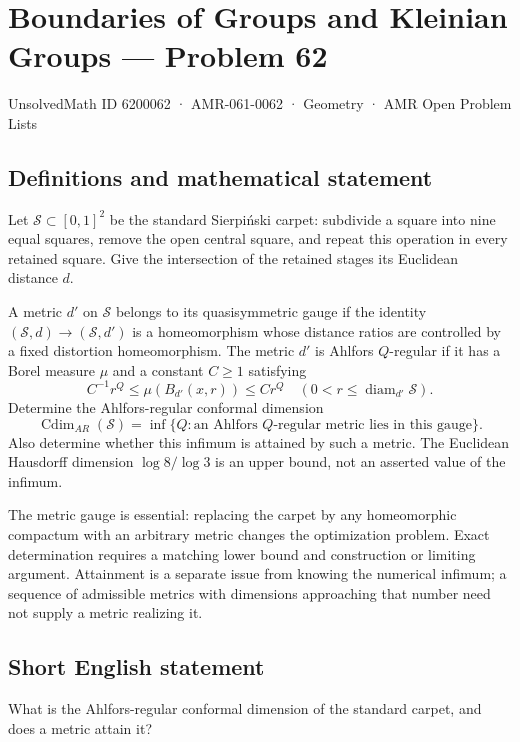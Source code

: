 \documentclass[11pt,a4paper]{article}
\begin{document}
\section*{Boundaries of Groups and Kleinian Groups — Problem 62}\label{6200062}
{\small UnsolvedMath ID 6200062 · AMR-061-0062 · Geometry · AMR Open Problem Lists}
\subsection{Definitions and mathematical statement}
Let $\mathcal S\subset[0,1]^2$ be the standard Sierpi\'nski carpet: subdivide a square into nine equal squares, remove the open central square, and repeat this operation in every retained square. Give the intersection of the retained stages its Euclidean distance $d$.

A metric $d'$ on $\mathcal S$ belongs to its quasisymmetric gauge if the identity $(\mathcal S,d)\to(\mathcal S,d')$ is a homeomorphism whose distance ratios are controlled by a fixed distortion homeomorphism. The metric $d'$ is Ahlfors $Q$-regular if it has a Borel measure $\mu$ and a constant $C\geq1$ satisfying
\[
 C^{-1}r^Q\leq\mu(B_{d'}(x,r))\leq Cr^Q
 \quad(0<r\leq\operatorname{diam}_{d'}\mathcal S).
\]
Determine the Ahlfors-regular conformal dimension
\[
 \operatorname{Cdim}_{AR}(\mathcal S)=
 \inf\{Q:\text{an Ahlfors $Q$-regular metric lies in this gauge}\}.
\]
Also determine whether this infimum is attained by such a metric. The Euclidean Hausdorff dimension $\log8/\log3$ is an upper bound, not an asserted value of the infimum.

The metric gauge is essential: replacing the carpet by any homeomorphic compactum with an arbitrary metric changes the optimization problem. Exact determination requires a matching lower bound and construction or limiting argument. Attainment is a separate issue from knowing the numerical infimum; a sequence of admissible metrics with dimensions approaching that number need not supply a metric realizing it.
\subsection{Short English statement}
What is the Ahlfors-regular conformal dimension of the standard carpet, and does a metric attain it?
\end{document}

